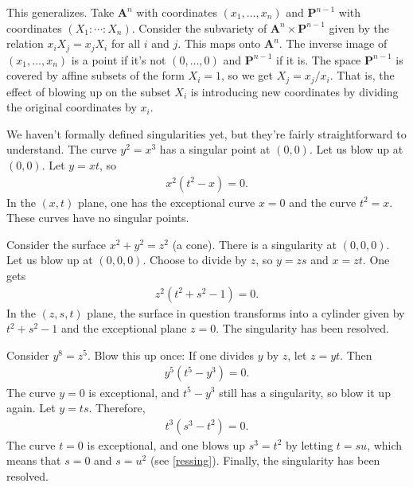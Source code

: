 \documentclass[11pt, oneside,margin=1in]{article}
\begin{document}
This generalizes. Take $\mathbf{A}^n$ with coordinates $(x_1,\hdots, x_n)$ and $\mathbf{P}^{n-1}$ with coordinates $(X_1:\cdots : X_n)$. Consider the subvariety of $\mathbf{A}^n\times \mathbf{P}^{n-1}$ given by the relation $x_iX_j = x_jX_i$ for all $i$ and $j$. This maps onto $\mathbf{A}^n$. The inverse image of $(x_1,\hdots, x_n)$ is a point if it's not $(0,\hdots, 0)$ and $\mathbf{P}^{n-1}$ if it is. The space $\mathbf{P}^{n-1}$ is covered by affine subsets of the form $X_i=1$, so we get $X_j = x_j/x_i$. That is, the effect of blowing up on the subset $X_i$ is introducing new coordinates by dividing the original coordinates by $x_i$.

\begin{example}\label{ressing}\text{}
We haven't formally defined singularities yet, but they're fairly straightforward to understand. The curve $y^2=x^3$ has a singular point at $(0,0)$. Let us blow up at $(0,0)$. Let $y=xt$, so 
\begin{align*}
	x^2(t^2-x)=0.
\end{align*}
In the $(x,t)$ plane, one has the exceptional curve $x=0$ and the curve $t^2=x$. These curves have no singular points.
\end{example}

\begin{example}[ ]\label{}\text{}
Consider the surface $x^2+y^2=z^2$ (a cone). There is a singularity at $(0,0,0)$. Let us blow up at $(0,0,0)$. Choose to divide by $z$, so $y=zs$ and $x=zt$. One gets
\begin{align*}
	z^2(t^2+s^2-1)=0.
\end{align*}
In the $(z,s,t)$ plane, the surface in question transforms into a cylinder given by $t^2+s^2-1$ and the exceptional plane $z=0$. The singularity has been resolved.
\end{example}

\begin{example}[ ]\label{}\text{}
Consider $y^8=z^5$. Blow this up once: If one divides $y$ by $z$, let $z=yt$. Then
\begin{align*}
	y^5(t^5-y^3)=0.
\end{align*}
The curve $y=0$ is exceptional, and $t^5-y^3$ still has a singularity, so blow it up again. Let $y= ts$. Therefore,
\begin{align*}
	t^3(s^3-t^2)=0.
\end{align*}
The curve $t=0$ is exceptional, and one blows up $s^3=t^2 $ by letting $t=su$, which means that $s=0$ and $s=u^2$ (see \cref{ressing}). Finally, the singularity has been resolved. 
\end{example}
\end{document}
